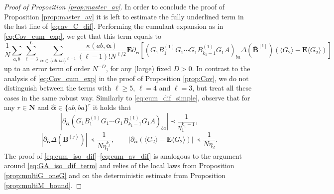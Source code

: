 \documentclass[10pt]{amsart}
\numberwithin{equation}{section}
\newcommand{\E}{\mathbf{E}}
\newcommand{\N}{\mathbf{N}}
\begin{document}
\begin{proof}[Proof of Proposition \ref{prop:master_av}]
In order to conclude the proof of Proposition \ref{prop:master_av} it is left to estimate the fully underlined term in the last line of \eqref{eq:av_C_dif}. Performing the cumulant expansion as in \eqref{eq:Cov_cum_exp}, we get that this term equals to
\begin{equation}
\frac{1}{N}\sum_{a,b} \sum_{\ell=3}^L\sum_{\bm{\alpha}\in \{ab,ba\}^{\ell-1}}\frac{\kappa(ab,\bm{\alpha})}{(\ell-1)!N^{\ell/2}}\E \partial_{\bm{\alpha}} \left[\left(G_1B_1^{(1)}G_1\cdots G_1B_{k_1-1}^{(1)}G_1A\right)_{ba}\!\!\Delta\left(\overline{\bm{B}}^{[1]}\right)\left(\langle G_2\rangle - \E\langle G_2\rangle\right)\right]
\label{eq:av_underline_exp}
\end{equation}
up to an error term of order $N^{-D}$, for any (large) fixed $D>0$. In contrast to the analysis of \eqref{eq:Cov_cum_exp} in the proof of Proposition \ref{prop:Cov}, we do not distinguish between the terms with $\ell\ge 5$, $\ell=4$ and $\ell=3$, but treat all these cases in the same robust way. Similarly to \eqref{eq:cum_dif_simple}, observe that for any $r\in\N$ and $\widehat{\bm{\alpha}}\in \{ab,ba\}^r$ it holds that
\begin{equation}
\left\vert \partial_{\widehat{\bm{\alpha}}} \left(G_1B_1^{(1)}G_1\cdots G_1B_{k_1-1}^{(1)}G_1A\right)_{ba}\right\vert \prec \frac{1}{\eta_1^{k_1-1}},
\label{eq:cum_iso_dif}
\end{equation}
\begin{equation}
\left\vert \partial_{\widehat{\bm{\alpha}}} \Delta \left(\bm{B}^{(j)}\right)\right\vert \prec \frac{1}{N\eta_1^{k_j}},\qquad \left\vert \partial_{\widehat{\bm{\alpha}}}\left(\langle G_2\rangle -\E\langle G_2\rangle\right)\right\vert\prec \frac{1}{N\eta_2}.
\label{eq:cum_av_dif}
\end{equation}
The proof of \eqref{eq:cum_iso_dif}--\eqref{eq:cum_av_dif} is analogous to the argument around \eqref{eq:GA_iso_dif_term} and relies of the local laws from Proposition \ref{prop:multiG_oneG} and on the deterministic estimate from Proposition \ref{prop:multiM_bound}.  

\end{proof}
\end{document}
